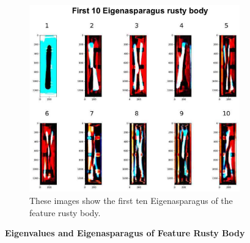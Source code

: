 \begin{figure}[!h]
	\begin{subfigure}{0.9\textwidth}
		\includegraphics[width=0.9\linewidth]{Figures/chapter04/pca_rustybody.png}
		\caption{These images show the first ten Eigenasparagus of the feature rusty body.}
	\end{subfigure}
    \caption[First Ten Eigenvalues and Eigenasparagus of Feature Rusty Body]{\textbf{Eigenvalues and Eigenasparagus of Feature Rusty Body}}
    \label{fig:PCArustybody}
\end{figure}


